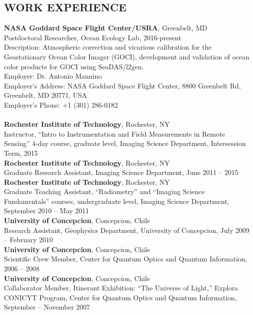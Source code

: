 \documentclass[11pt]{res} %
\begin{document}
\begin{resume}
\section{WORK EXPERIENCE}
\vspace{0.1in}
{\bf NASA Goddard Space Flight Center/USRA}, Greenbelt, MD\\
Postdoctoral Researcher, Ocean Ecology Lab, 2016-present\\
Description: Atmospheric correction and vicarious calibration for the Geostationary Ocean Color Imager (GOCI), development and validation of ocean color products for GOCI using SeaDAS/l2gen.\\
Employer: Dr. Antonio Mannino\\
Employer's Address: NASA Goddard Space Flight Center, 8800 Greenbelt Rd, Greenbelt, MD 20771, USA\\
Employer's Phone: +1 (301) 286-0182\\
\vspace{0.001in}\\
{\bf Rochester Institute of Technology}, Rochester, NY\\
Instructor, ``Intro to Instrumentation and Field Measurements in Remote Sensing'' 4-day course, graduate level, Imaging Science Department, Intersession Term, 2015
\vspace{0.1in}\\
{\bf Rochester Institute of Technology}, Rochester, NY\\
Graduate Research Assistant, Imaging Science Department, June 2011 -- 2015
\vspace{0.1in}\\
{\bf Rochester Institute of Technology}, Rochester, NY\\
Graduate Teaching Assistant, ``Radiometry'' and  ``Imaging Science Fundamentals'' courses, undergraduate level, Imaging Science Department, September 2010 -- May 2011
\vspace{0.1in}\\
{\bf University of Concepcion}, Concepcion, Chile\\
Research Assistant, Geophysics Department, University of Concepcion, July 2009 -- February 2010
\vspace{-0.1in}\\
{\bf University of Concepcion}, Concepcion, Chile\\
Scientific Crew Member, Center for Quantum Optics and Quantum Information, 2006 -- 2008
\vspace{0.1in}\\
{\bf University of Concepcion}, Concepcion, Chile\\
Collaborator Member, Itinerant Exhibition: ``The Universe of Light,'' Explora CONICYT Program, Center for Quantum Optics and Quantum Information, September -- November 2007\\


\end{resume}
\end{document}
